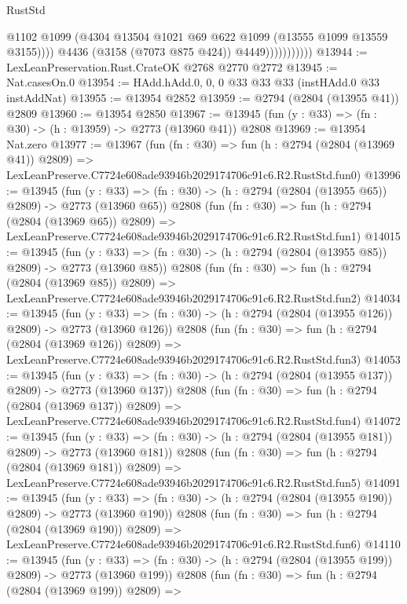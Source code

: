 \begin{lexlean}{RustStd}
\begin{coremodule}
                              @1102
                              @1099
                              (@4304 @13504 @1021 @69 @622 @1099 (@13555 @1099 @13559 @3155))))
                          @4436
                          (@3158 (@7073 @875 @424))
                          @4449)))))))))))
@13944 := LexLeanPreservation.Rust.CrateOK @2768 @2770 @2772
@13945 := Nat.casesOn.{0}
@13954 := HAdd.hAdd.{0, 0, 0} @33 @33 @33 (instHAdd.{0} @33 instAddNat)
@13955 := @13954 @2852
@13959 := @2794 (@2804 (@13955 @41)) @2809
@13960 := @13954 @2850
@13967 := @13945 (fun (y : @33) => (fn : @30) -> (h : @13959) -> @2773 (@13960 @41)) @2808
@13969 := @13954 Nat.zero
@13977 := @13967
    (fun (fn : @30) =>
    fun (h : @2794 (@2804 (@13969 @41)) @2809) =>
    LexLeanPreserve.C7724e608ade93946b2029174706c91c6.R2.RustStd.fun0)
@13996 := @13945
    (fun (y : @33) => (fn : @30) -> (h : @2794 (@2804 (@13955 @65)) @2809) -> @2773 (@13960 @65))
    @2808
    (fun (fn : @30) =>
    fun (h : @2794 (@2804 (@13969 @65)) @2809) =>
    LexLeanPreserve.C7724e608ade93946b2029174706c91c6.R2.RustStd.fun1)
@14015 := @13945
    (fun (y : @33) => (fn : @30) -> (h : @2794 (@2804 (@13955 @85)) @2809) -> @2773 (@13960 @85))
    @2808
    (fun (fn : @30) =>
    fun (h : @2794 (@2804 (@13969 @85)) @2809) =>
    LexLeanPreserve.C7724e608ade93946b2029174706c91c6.R2.RustStd.fun2)
@14034 := @13945
    (fun (y : @33) => (fn : @30) -> (h : @2794 (@2804 (@13955 @126)) @2809) -> @2773 (@13960 @126))
    @2808
    (fun (fn : @30) =>
    fun (h : @2794 (@2804 (@13969 @126)) @2809) =>
    LexLeanPreserve.C7724e608ade93946b2029174706c91c6.R2.RustStd.fun3)
@14053 := @13945
    (fun (y : @33) => (fn : @30) -> (h : @2794 (@2804 (@13955 @137)) @2809) -> @2773 (@13960 @137))
    @2808
    (fun (fn : @30) =>
    fun (h : @2794 (@2804 (@13969 @137)) @2809) =>
    LexLeanPreserve.C7724e608ade93946b2029174706c91c6.R2.RustStd.fun4)
@14072 := @13945
    (fun (y : @33) => (fn : @30) -> (h : @2794 (@2804 (@13955 @181)) @2809) -> @2773 (@13960 @181))
    @2808
    (fun (fn : @30) =>
    fun (h : @2794 (@2804 (@13969 @181)) @2809) =>
    LexLeanPreserve.C7724e608ade93946b2029174706c91c6.R2.RustStd.fun5)
@14091 := @13945
    (fun (y : @33) => (fn : @30) -> (h : @2794 (@2804 (@13955 @190)) @2809) -> @2773 (@13960 @190))
    @2808
    (fun (fn : @30) =>
    fun (h : @2794 (@2804 (@13969 @190)) @2809) =>
    LexLeanPreserve.C7724e608ade93946b2029174706c91c6.R2.RustStd.fun6)
@14110 := @13945
    (fun (y : @33) => (fn : @30) -> (h : @2794 (@2804 (@13955 @199)) @2809) -> @2773 (@13960 @199))
    @2808
    (fun (fn : @30) =>
    fun (h : @2794 (@2804 (@13969 @199)) @2809) =>

\end{coremodule}
\end{lexlean}
